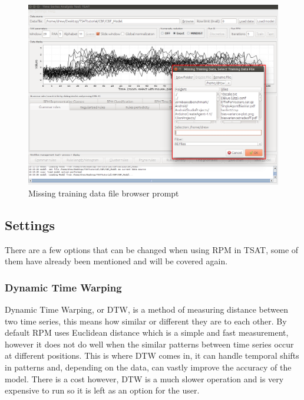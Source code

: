 \documentclass[titlepage, letterpaper, 12pt]{article}
\begin{document}
\begin{figure}[H]
	\includegraphics[width=\textwidth]{TSAT-load-model-failed-data}
	\caption{Missing training data file browser prompt}
	\label{fig:TSAT-load-model-failed-data}
\end{figure}

\subsection{Settings}
\label{RPMSettings}
There are a few options that can be changed when using RPM in TSAT, some of them have already been mentioned and will be covered again.

\subsubsection{Dynamic Time Warping}
\label{DTW}
Dynamic Time Warping, or DTW, is a method of measuring distance between two time series, this means how similar or different they are to each other. By default RPM uses Euclidean distance which is a simple and fast measurement, however it does not do well when the similar patterns between time series occur at different positions. This is where DTW comes in, it can handle temporal shifts in patterns and, depending on the data, can vastly improve the accuracy of the model. There is a cost however, DTW is a much slower operation and is very expensive to run so it is left as an option for the user. 
\end{document}
